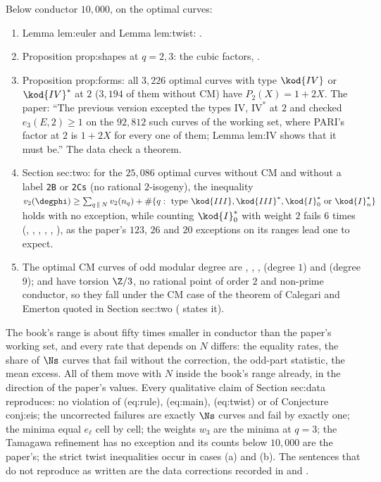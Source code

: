 \begin{sloppypar}
\begin{example}\label{ex:computation:repro-further}
Below conductor $10{,}000$, on the optimal curves:
\begin{enumerate}[label=(\alph*)]
\item Lemma lem:euler and Lemma lem:twist: .
\item Proposition prop:shapes at $q=2,3$: the cubic factors, .
\item Proposition prop:forms: all $3{,}226$ optimal curves with type $\kod{IV}$ or $\kod{IV}^*$ at $2$ ($3{,}194$ of them without CM) have $P_2(X)=1+2X$. The paper: ``The
previous version excepted the types $\mathrm{IV}$, $\mathrm{IV}^*$ at $2$ and checked $e_3(E,2)\ge1$ on the $92{,}812$ such curves of the working set, where PARI's
factor at $2$ is $1+2X$ for every one of them; Lemma lem:IV shows that it must be.'' The data check a theorem.
\item Section sec:two: for the $25{,}086$ optimal curves without CM and without a label \texttt{2B} or \texttt{2Cs} (no rational $2$-isogeny), the inequality
$v_2(\degphi)\ge\sum_{q\,\|\,N}v_2(n_q)+\#\{q:\ \text{type }\kod{III},\kod{III}^*,\kod{I}_0^*\text{ or }\kod{I}_n^*\}$ holds with no exception, while counting $\kod{I}_0^*$ with weight $2$ fails
$6$ times (, , , , , ), as the paper's $123$, $26$ and $20$ exceptions on its ranges lead one to expect.
\item The optimal CM curves of odd modular degree are , , ,  (degree $1$) and  (degree $9$);  and
 have torsion $\Z/3$, no rational point of order $2$ and non-prime conductor, so they fall under the CM case of the theorem of Calegari and Emerton
quoted in Section sec:two ( states it).
\end{enumerate}
\end{example}

\begin{remark}\label{rem:computation:comparison}
The book's range is about fifty times smaller in conductor than the paper's working set, and every rate that depends on $N$ differs: the equality rates,
the share of $\Ns$ curves that fail without the correction, the odd-part statistic, the mean excess. All of them move with $N$ inside the book's range
already, in the direction of the paper's values. Every qualitative claim of Section sec:data reproduces: no violation of (eq:rule), (eq:main),
(eq:twist) or of Conjecture conj:eis; the uncorrected failures are exactly $\Ns$ curves and fail by exactly one; the minima equal $e_\ell$ cell by cell; the
weights $w_3$ are the minima at $q=3$; the Tamagawa refinement has no exception and its counts below $10{,}000$ are the paper's; the strict twist
inequalities occur in cases (a) and (b). The sentences that do not reproduce as written are the data corrections recorded in
 and .
\end{remark}


\end{sloppypar}
